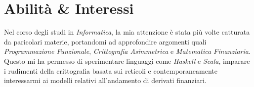 \documentclass[10pt]{article} %
\begin{document}
\vspace{20pt}
\section{Abilit\`{a} \& Interessi}





Nel corso degli studi in \textit{Informatica}, la mia attenzione \`{e} stata pi\`{u} volte catturata da paricolari materie, portandomi ad approfondire argomenti quali \textit{Programmazione Funzionale}, \textit{Crittografia Asimmetrica} e \textit{Matematica Finanziaria}. Questo mi ha permesso di sperimentare linguaggi come \textit{Haskell} e \textit{Scala}, imparare i rudimenti della crittografia basata sui reticoli e contemporaneamente interessarmi ai modelli relativi all'andamento di derivati finanziari.

\medskip %



\end{document}
